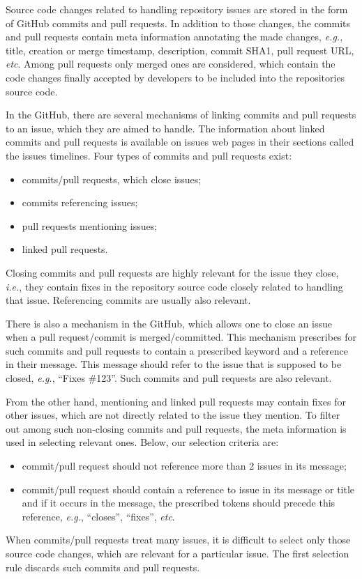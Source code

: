 \documentclass[10pt,conference]{IEEEtran}
\begin{document}
Source code changes related to handling repository issues are stored in the form of GitHub commits and pull requests.
In addition to those changes, the commits and pull requests contain meta information annotating the made changes, \textit{e.g.}, title, creation or merge timestamp, description,
commit SHA1, pull request URL, \textit{etc}. Among pull requests only merged ones are considered, which contain the code changes finally accepted by developers
to be included into the repositories source code.

In the GitHub, there are several mechanisms of linking commits and pull requests to an issue, which they are aimed to handle.
The information about linked commits and pull requests is available on issues web pages in their sections called the issues timelines.
Four types of commits and pull requests exist:
\begin{itemize}
\item commits/pull requests, which close issues;

\item commits referencing issues;

\item pull requests mentioning issues;

\item linked pull requests.
\end{itemize}
Closing commits and pull requests are highly relevant for the issue they close, \textit{i.e.}, they contain fixes
in the repository source code closely related to handling that issue. Referencing commits are usually also relevant.

There is also a mechanism in the GitHub, which allows one to close an issue when a pull request/commit
is merged/committed. This mechanism prescribes for such commits and pull requests to contain a prescribed keyword and
a reference in their message. This message should refer to the issue that is supposed to be closed, \textit{e.g.}, ``Fixes \#123''. Such commits and pull requests are also relevant.

From the other hand, mentioning and linked pull requests may contain fixes for other issues, which are not directly related to the issue they mention. 
To filter out among such non-closing commits and pull requests, the meta information is used in selecting relevant ones.
Below, our selection criteria are:
\begin{itemize}
\item commit/pull request should not reference more than 2 issues in its message;

\item commit/pull request should contain a reference to issue in its message or title and if it occurs in the message, the prescribed tokens should precede this reference, \textit{e.g.}, ``closes'', ``fixes'', \textit{etc}.
\end{itemize}
When commits/pull requests treat many issues, it is difficult to select only those source code changes, which are relevant for a particular issue.
The first selection rule discards such commits and pull requests. 
\end{document}

